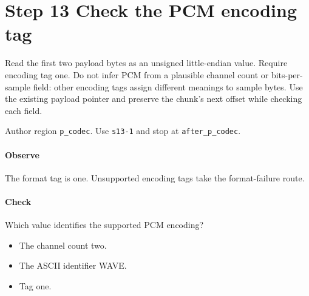 \section{Step 13 Check the PCM encoding tag}\label{pcm-wav-s13}
Read the first two payload bytes as an unsigned little-endian value. Require encoding tag one. Do not infer PCM from a plausible channel count or bits-per-sample field: other encoding tags assign different meanings to sample bytes. Use the existing payload pointer and preserve the chunk's next offset while checking each field.

Author region \texttt{p\_codec}. Use \texttt{s13-1} and stop at \texttt{after\_p\_codec}.

\paragraph{Observe} The format tag is one. Unsupported encoding tags take the format-failure route.

\paragraph{Check} Which value identifies the supported PCM encoding?
\begin{itemize}
  \item[A.] The channel count two.
  \item[B.] The ASCII identifier WAVE.
  \item[C.] Tag one.
\end{itemize}
